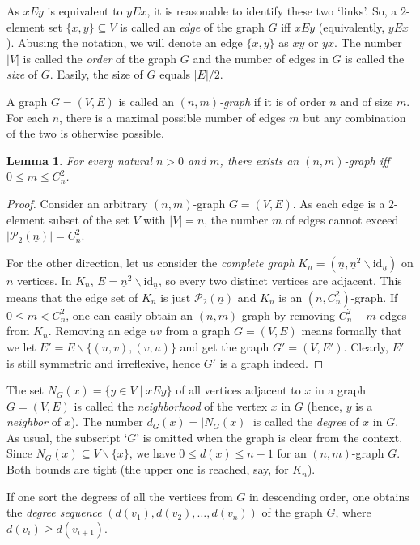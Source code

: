 \documentclass[12pt,notitlepage]{article}
\theoremstyle{plain}
\newtheorem{lemma}[thm]{Lemma}
\theoremstyle{definition}
\theoremstyle{plain}
\newcommand{\sbs}{\subseteq}
\renewcommand{\setminus}{\smallsetminus}
\newcommand{\mP}{\mathcal{P}}
\newcommand{\id}{\mathrm{id}}
\newcommand{\ul}[1]{\underline{#1}}
\newcommand{\1}{\mathbf{1}}
\newcommand{\0}{\mathbf{0}}
\begin{document}
As $x E y$ is equivalent to $y E x$, it is reasonable to identify these two `links'. So, a $2$-element set $\{x, y\} \sbs V$ is called an \emph{edge} of the graph $G$ iff $x E y$ (equivalently, $y E x$). Abusing the notation, we will denote an edge $\{x, y\}$ as $x y$ or $y x$. The number $|V|$ is called the \emph{order} of the graph $G$ and the number of edges in $G$ is called the \emph{size} of $G$. Easily, the size of $G$ equals $|E| / 2$.

A graph $G = (V, E)$ is called an \emph{$(n,m)$-graph} if it is of order $n$ and of size $m$. For each $n$, there is a maximal possible number of edges $m$ but any combination of the two is otherwise possible.
\begin{lemma}\label{L14:l_ord_size}
For every natural $n > 0$ and $m$, there exists an $(n,m)$-graph iff $0 \leq m \leq C_n^2$.
\end{lemma}
\begin{proof}
Consider an arbitrary $(n,m)$-graph $G = (V, E)$. As each edge is a $2$-element subset of the set $V$ with $|V| = n$, the number $m$ of edges cannot exceed $|\mP_2(\ul{n})| = C_n^2$.

For the other direction, let us consider the \emph{complete graph} $K_n = (\ul{n}, \ul{n}^2 \setminus \id_{\ul{n}})$ on $n$ vertices. In $K_n$, $E = \ul{n}^2 \setminus \id_{\ul{n}}$, so every two distinct vertices are adjacent. This means that the edge set of $K_n$ is just $\mP_2(\ul{n})$ and $K_n$ is an $(n, C_n^2)$-graph. If $0 \leq m < C_n^2$, one can easily obtain an $(n, m)$-graph by removing $C_n^2 - m$ edges from $K_n$. Removing an edge $u v$ from a graph $G = (V, E)$ means formally that we let $E' = E \setminus \{(u, v), (v, u)\}$ and get the graph $G' = (V, E')$. Clearly, $E'$ is still symmetric and irreflexive, hence $G'$ is a graph indeed.
\end{proof}

The set $N_G(x) = \{ y \in V \mid x E y \}$ of all vertices adjacent to $x$ in a graph $G = (V, E)$ is called the \emph{neighborhood} of the vertex $x$ in $G$ (hence, $y$ is a \emph{neighbor} of $x$). The number $d_G(x) = |N_G(x)|$ is called the \emph{degree} of $x$ in $G$. As usual, the subscript `$G$' is omitted when the graph is clear from the context. Since $N_G(x)\sbs V \setminus \{ x \}$, we have $0 \leq d(x) \leq n - 1$ for an $(n, m)$-graph $G$. Both bounds are tight (the upper one is reached, say, for $K_n$).

If one sort the degrees of all the vertices from $G$ in descending order, one obtains the \emph{degree sequence} $(d(v_1), d(v_2), \ldots, d(v_n))$ of the graph $G$, where $d(v_i) \geq d(v_{i + 1})$.
\end{document}
